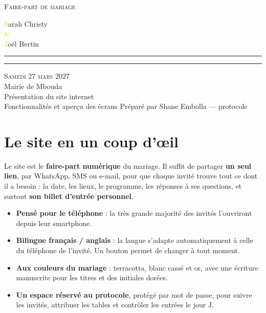 \documentclass[11pt,a4paper]{article}
\newcommand{\ornament}{%
  \begin{center}
    \textcolor{gold}{\rule[0.6ex]{3.2cm}{0.4pt}\hspace{0.6em}\raisebox{0.15ex}{$\blacklozenge$}\hspace{0.6em}\rule[0.6ex]{3.2cm}{0.4pt}}
  \end{center}}
\begin{document}
\begin{titlepage}
  \pagecolor{ivory}
  \centering
  \vspace*{2.2cm}
  {\large\scshape\textcolor{muted}{Faire-part de mariage}}\\[1.4cm]
  {\weddingscript\fontsize{58}{64}\selectfont
    \textcolor{gold}{S}\textcolor{terracotta}{arah Christy}\\[0.2em]
    \textcolor{gold}{\fontsize{42}{48}\selectfont \&}\\[0.2em]
    \textcolor{gold}{J}\textcolor{terracotta}{oël Bertin}\par}
  \ornament
  \vspace{0.4cm}
  {\Large\scshape\textcolor{terracotta}{Samedi 27 mars 2027}}\\[0.3em]
  {\large Mairie de Mbouda}\\[2.2cm]
  {\LARGE Présentation du site internet}\\[0.6em]
  {\large\textcolor{muted}{Fonctionnalités et aperçu des écrans}}
  \vfill
  {\small\textcolor{muted}{Préparé par Shane Embolla — protocole}}
\end{titlepage}

\section{Le site en un coup d'œil}

Le site est le \textbf{faire-part numérique} du mariage. Il suffit de partager \textbf{un seul lien}, par WhatsApp, SMS ou e-mail, pour que chaque invité trouve tout ce dont il a besoin : la date, les lieux, le programme, les réponses à ses questions, et surtout \textbf{son billet d'entrée personnel}.

\begin{itemize}
  \item \textbf{Pensé pour le téléphone} : la très grande majorité des invités l'ouvriront depuis leur smartphone.
  \item \textbf{Bilingue français / anglais} : la langue s'adapte automatiquement à celle du téléphone de l'invité. Un bouton permet de changer à tout moment.
  \item \textbf{Aux couleurs du mariage} : terracotta, blanc cassé et or, avec une écriture manuscrite pour les titres et des initiales dorées.
  \item \textbf{Un espace réservé au protocole}, protégé par mot de passe, pour suivre les invités, attribuer les tables et contrôler les entrées le jour J.
\end{itemize}
\end{document}
